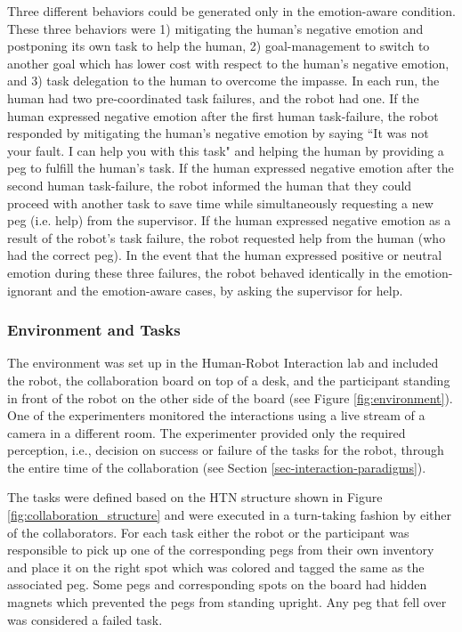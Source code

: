 \documentclass[12pt]{report}
\begin{document}
Three different behaviors could be generated only in the emotion-aware
condition. These three behaviors were 1) mitigating the human's negative emotion
and postponing its own task to help the human, 2) goal-management to switch to
another goal which has lower cost with respect to the human's negative emotion,
and 3) task delegation to the human to overcome the impasse. In each run, the
human had two pre-coordinated task failures, and the robot had one. If the human
expressed negative emotion after the first human task-failure, the robot
responded by mitigating the human's negative emotion by saying  ``It was not
your fault. I can help you with this task" and helping the human by providing a
peg to fulfill the human's task. If the human expressed negative emotion after
the second human task-failure, the robot informed the human that they could
proceed with another task to save time while simultaneously requesting a new peg
(i.e. help) from the supervisor. If the human expressed negative emotion as a
result of the robot's task failure, the robot requested help from the human (who
had the correct peg). In the event that the human expressed positive or neutral
emotion during these three failures, the robot behaved identically in the
emotion-ignorant and the emotion-aware cases, by asking the supervisor for help. 

\subsubsection{Environment and Tasks}

The environment was set up in the Human-Robot Interaction lab and included the
robot, the collaboration board on top of a desk, and the participant standing in
front of the robot on the other side of the board (see Figure
\ref{fig:environment}). One of the experimenters monitored the interactions
using a live stream of a camera in a different room. The experimenter provided
only the required perception, i.e., decision on success or failure of the tasks
for the robot, through the entire time of the collaboration (see Section
\ref{sec-interaction-paradigms}).

The tasks were defined based on the HTN structure shown in Figure
\ref{fig:collaboration_structure} and were executed in a turn-taking fashion by
either of the collaborators. For each task either the robot or the participant
was responsible to pick up one of the corresponding pegs from their own
inventory and place it on the right spot which was colored and tagged the same
as the associated peg. Some pegs and corresponding spots on the board had hidden
magnets which prevented the pegs from standing upright. Any peg that fell over
was considered a failed task.
\end{document}
